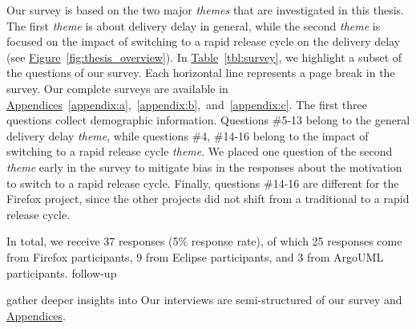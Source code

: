 Our survey is based on the two major {\em themes} that are investigated in this
thesis. The first {\em theme} is about
delivery delay in general, while the second {\em theme} is focused on the
impact of switching to a rapid release cycle on the delivery delay (see
\hyperref[fig:thesis_overview]{Figure}~\ref{fig:thesis_overview}). In
\DIFaddbegin {}\DIFaddend \hyperref[tbl:survey]{Table}~\ref{tbl:survey}, we highlight a subset of the
questions of our survey. Each horizontal line represents a page break in the
survey. Our complete surveys are available in
\hyperref[appendix:a]{Appendices}~\ref{appendix:a},~\ref{appendix:b},~and~\ref{appendix:c}.
The first three questions collect demographic information. Questions \#5-13
belong to the general delivery delay {\em theme}, while questions \#4,
\#14-16 belong to the impact of switching to a rapid release cycle {\em theme}.
We placed one question of the second {\em theme} early in the survey to mitigate
bias in the responses about the motivation to switch to a rapid release cycle.
Finally, questions \#14-16 are different for the Firefox project, since the
other projects did not shift from a traditional to a rapid release cycle. 

In total, we receive 37 responses (5\% response rate), of which 25 responses
come from Firefox participants, 9 from Eclipse participants, and 3 from ArgoUML
participants. \DIFdelbegin {}\DIFdelend \DIFaddbegin {}\DIFaddend follow-up \DIFdelbegin {}\DIFdelend \DIFaddbegin {}

\DIFaddend gather deeper insights into \DIFdelbegin {}\DIFdelend \DIFaddbegin {}   \DIFaddend Our interviews are semi-structured \DIFdelbegin {}\DIFdelend \DIFaddbegin \DIFadd{(}\ie {}\DIFaddend of our survey and \DIFdelbegin {}\DIFdelend \DIFaddbegin {}\hyperref[invitation_letter]{Appendices}\DIFaddend .


